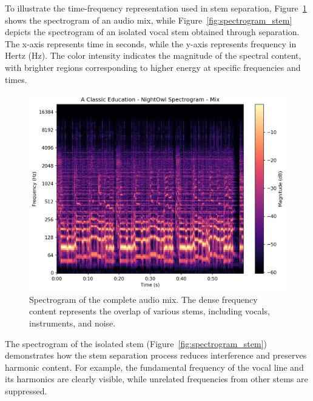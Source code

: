 \documentclass[10pt,twocolumn]{article}
\begin{document}
To illustrate the time-frequency representation used in stem separation, Figure~\ref{fig:spectrogram_full} shows the spectrogram of an audio mix, while Figure~\ref{fig:spectrogram_stem} depicts the spectrogram of an isolated vocal stem obtained through separation. The x-axis represents time in seconds, while the y-axis represents frequency in Hertz (Hz). The color intensity indicates the magnitude of the spectral content, with brighter regions corresponding to higher energy at specific frequencies and times.

\begin{figure}[h]
    \centering
    \includegraphics[width=0.95\linewidth]{results graph/mix.png}
    \caption{Spectrogram of the complete audio mix. The dense frequency content represents the overlap of various stems, including vocals, instruments, and noise.}
    \label{fig:spectrogram_full}
\end{figure}

The spectrogram of the isolated stem (Figure~\ref{fig:spectrogram_stem}) demonstrates how the stem separation process reduces interference and preserves harmonic content. For example, the fundamental frequency of the vocal line and its harmonics are clearly visible, while unrelated frequencies from other stems are suppressed.
\end{document}
